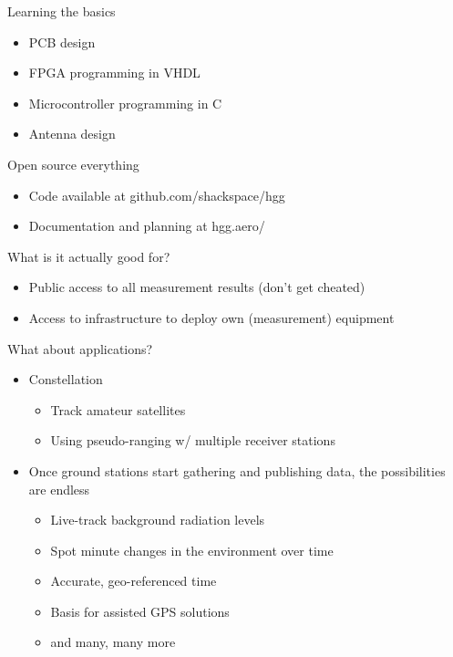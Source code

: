 	\begin{frame}{Learning the basics}
		\begin{itemize}
			\item PCB design
			\item FPGA programming in VHDL
			\item Microcontroller programming in C
			\item Antenna design
		\end{itemize}
	\end{frame}

	\begin{frame}{Open source everything}
		\begin{itemize}
			\item Code available at github.com/shackspace/hgg
			\item Documentation and planning at hgg.aero/
		\end{itemize}
	\end{frame}

	\begin{frame}{What is it actually good for?}
		\begin{itemize}
			\item Public access to all measurement results (don't get cheated)
			\item Access to infrastructure to deploy own (measurement) equipment
		\end{itemize}
	\end{frame}

	\begin{frame}{What about applications?}
		\begin{itemize}
			\item Constellation
			\begin{itemize}
				\item Track amateur satellites
				\item Using pseudo-ranging w/ multiple receiver stations
			\end{itemize}
			\item Once ground stations start gathering and publishing data, the possibilities are endless
			\begin{itemize}
				\item Live-track background radiation levels
				\item Spot minute changes in the environment over time
				\item Accurate, geo-referenced time
				\item Basis for assisted GPS solutions
				\item and many, many more
			\end{itemize}
		\end{itemize}
	\end{frame}


